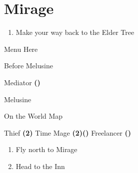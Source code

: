 \chapter{Mirage}

\vspace{\baselineskip}

\begin{paracol}{2}

\begin{enumerate}
    \item Make your way back to the Elder Tree
\end{enumerate}

\switchcolumn
\begin{misc}{Menu Here}
\end{misc}

\switchcolumn
\begin{menu}{Before Melusine}
    \varwb
    \begin{jobMenu}
        \cara Mediator \textbf{(\pointUp)} \ability{!\white}
    \end{jobMenu}
    \begin{magicMenu}
        \cara \cure \space \then {}
    \end{magicMenu}
    \varwe
\end{menu}

\begin{boss}{Melusine}
    \varwb
    \begin{round}{1}
        \cara \leftCommand{\release}
        \faris \leftCommand{\release}
        \bartz \rightCommand{\black} \then \fire
    \end{round}
    \varwe
\end{boss}

\begin{menu}{On the World Map}
    \varwb
    \begin{itemMenu}
        \phoenixDownMenu {}
        \antidoteMenu {}
    \end{itemMenu}
    \begin{jobMenu}
        \cara Thief \textbf{(2\pointRight)} \ability{!\escape}
        \lenna Time Mage \textbf{(2\pointLeft)(\pointUp)}
        \bartz Freelancer \textbf{(\pointLeft)} \ability{!\escape \space !\combine}
    \end{jobMenu}
    \varwe
\end{menu}

\begin{enumerate}[resume]
    \item Fly north to Mirage
    \item Head to the Inn
\end{enumerate}


\end{paracol}
